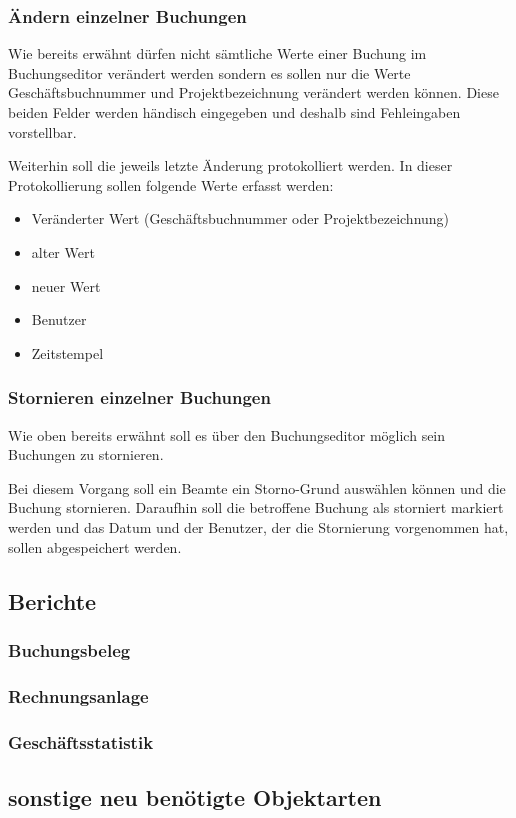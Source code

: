 \subsubsection{Ändern einzelner Buchungen} \label{subsubsec:aendern_buchung}
Wie bereits erwähnt dürfen nicht sämtliche Werte einer Buchung im Buchungseditor verändert werden sondern es sollen nur die Werte Geschäftsbuchnummer und Projektbezeichnung verändert werden können.
Diese beiden Felder werden händisch eingegeben und deshalb sind Fehleingaben vorstellbar.

Weiterhin soll die jeweils letzte Änderung protokolliert werden. In dieser Protokollierung  sollen folgende Werte erfasst werden:
\begin{itemize}
\item Veränderter Wert (Geschäftsbuchnummer oder Projektbezeichnung)
\item alter Wert
\item neuer Wert
\item Benutzer
\item Zeitstempel
\end{itemize}

\subsubsection{Stornieren einzelner Buchungen} \label{subsubsec:storno_buchung}
Wie oben bereits erwähnt soll es über den Buchungseditor möglich sein Buchungen zu stornieren.

Bei diesem Vorgang soll ein Beamte ein Storno-Grund auswählen können und die Buchung stornieren. Daraufhin soll die betroffene Buchung als storniert markiert werden und das Datum und der Benutzer, der die Stornierung vorgenommen hat, sollen abgespeichert werden.



\subsection{Berichte}
\subsubsection{Buchungsbeleg}
\subsubsection{Rechnungsanlage}
\subsubsection{Geschäftsstatistik}

\subsection{sonstige neu benötigte Objektarten}




